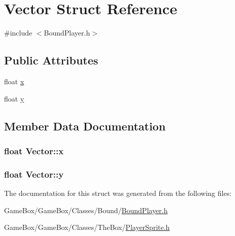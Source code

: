 \hypertarget{struct_vector}{\section{\-Vector \-Struct \-Reference}
\label{struct_vector}
}


{\ttfamily \#include $<$\-Bound\-Player.\-h$>$}

\subsection*{\-Public \-Attributes}
\begin{DoxyCompactItemize}
\item 
float \hyperlink{struct_vector_aca49165049a1e21ae47afcfc078819ed}{x}
\item 
float \hyperlink{struct_vector_a81be9102fca6d9beea3efef522c4c09d}{y}
\end{DoxyCompactItemize}


\subsection{\-Member \-Data \-Documentation}
\hypertarget{struct_vector_aca49165049a1e21ae47afcfc078819ed}{
\subsubsection[{x}]{\setlength{\rightskip}{0pt plus 5cm}float {\bf \-Vector\-::x}}}\label{struct_vector_aca49165049a1e21ae47afcfc078819ed}
\hypertarget{struct_vector_a81be9102fca6d9beea3efef522c4c09d}{
\subsubsection[{y}]{\setlength{\rightskip}{0pt plus 5cm}float {\bf \-Vector\-::y}}}\label{struct_vector_a81be9102fca6d9beea3efef522c4c09d}


\-The documentation for this struct was generated from the following files\-:\begin{DoxyCompactItemize}
\item 
\-Game\-Box/\-Game\-Box/\-Classes/\-Bound/\hyperlink{_bound_player_8h}{\-Bound\-Player.\-h}\item 
\-Game\-Box/\-Game\-Box/\-Classes/\-The\-Box/\hyperlink{_player_sprite_8h}{\-Player\-Sprite.\-h}\end{DoxyCompactItemize}
